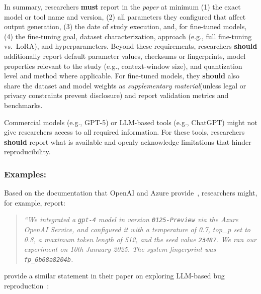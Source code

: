 \documentclass[smallextended]{svjour3}
\newcommand{\must}{\textbf{must}\xspace}
\newcommand{\should}{\textbf{should}\xspace}
\newcommand{\paper}{\emph{paper}\xspace}
\newcommand{\supplementarymaterial}{\emph{supplementary material}\xspace}
\newcommand{\paper}{\emph{paper}\xspace}
\newcommand{\supplementarymaterial}{\emph{supplementary material}\xspace}
\newcommand{\guidelinesubsubsection}[1]{\subsubsection{\bfseries #1:}}
\newcommand{\guidelinesubsubsection}[1]{\subsubsection{#1}}
\begin{document}
In summary, researchers \must report in the \paper at minimum (1) the exact model or tool name and version, (2) all parameters they configured that affect output generation, (3) the date of study execution, and, for fine-tuned models, (4) the fine-tuning goal, dataset characterization, approach (e.g., full fine-tuning vs.\ LoRA), and hyperparameters. Beyond these requirements, researchers \should additionally report default parameter values, checksums or fingerprints, model properties relevant to the study (e.g., context-window size), and quantization level and method where applicable. For fine-tuned models, they \should also share the dataset and model weights as \supplementarymaterial (unless legal or privacy constraints prevent disclosure) and report validation metrics and benchmarks.

Commercial models (e.g., GPT-5) or LLM-based tools (e.g., ChatGPT) might not give researchers access to all required information.
For these tools, researchers \should report what is available and openly acknowledge limitations that hinder reproducibility.

\guidelinesubsubsection{Examples}

Based on the documentation that OpenAI and Azure provide~\cite{OpenAI25, Azure25}, researchers might, for example, report:

\begin{quote}
\it
 ``We integrated a  \texttt{gpt-4} model in version \texttt{0125-Preview} via the Azure OpenAI Service, and configured it with a temperature of 0.7, top\_p set to 0.8, a maximum token length of 512, and the  seed value \texttt{23487}.
 We ran our experiment on 10th January 2025. The system fingerprint was \texttt{fp\_6b68a8204b}.
\end{quote}

\citeauthor{DBLP:conf/icse/KangYY23} provide a similar statement in their paper on exploring LLM-based bug reproduction~\cite{DBLP:conf/icse/KangYY23}:
\end{document}
